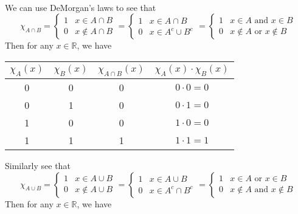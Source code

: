 \begin{enumerate}
    \\We can use DeMorgan's laws to see that
    \[
        \chi_{A\cap B}=
        \begin{cases}
            1&x\in A\cap B\\
            0&x\notin A\cap B
        \end{cases}  
        =
        \begin{cases}
            1&x\in A\cap B\\
            0&x\in A^c\cup B^c
        \end{cases}
        =
        \begin{cases}
            1&x\in A \text{ and }x\in B\\
            0&x\notin A\text{ or }x\notin B
        \end{cases} 
    \]
    Then for any $x\in\mathbb{R}$, we have
    \begin{center}
        \begin{tabular}{|c c c c|} 
        \hline
        $\chi_A(x)$  & $\chi_B(x)$ & $\chi_{A\cap B}(x)$ & $\chi_A(x)\cdot\chi_B(x)$ \\ [0.5ex] 
        \hline\hline
        0 & 0 & 0 & $0\cdot0=0$  \\ 
        \hline
        0 & 1 & 0 & $0\cdot1=0$   \\
        \hline
        1 & 0 & 0 & $1\cdot0=0$   \\
        \hline
        1 & 1 & 1 & $1\cdot1=1$ \\[1ex] 
        \hline
        \end{tabular}
    \end{center}
    Similarly see that
    \[
        \chi_{A\cup B}=
        \begin{cases}
            1&x\in A\cup B\\
            0&x\notin A\cup B
        \end{cases}  
        =
        \begin{cases}
            1&x\in A\cup B\\
            0&x\in A^c\cap B^c
        \end{cases}
        =
        \begin{cases}
            1&x\in A \text{ or }x\in B\\
            0&x\notin A\text{ and }x\notin B
        \end{cases} 
    \]
    Then for any $x\in\mathbb{R}$, we have
    \begin{center}
        \begin{tabular}{|c c c c|} 

\end{tabular}
\end{center}
\end{enumerate}

